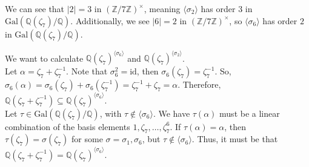 \documentclass[10pt]{extarticle}
\newcommand{\Q}{\mathbb{Q}}
\newcommand{\Z}{\mathbb{Z}}
\begin{document}
  We can see that $|2| = 3$ in $(\Z/7\Z)^{\times}$, meaning $\langle \sigma_2\rangle $ has order 3 in $\text{Gal}\left(\Q(\zeta_7)/\Q\right)$. Additionally, we see $|6| = 2$ in $\left(\Z/7\Z\right)^{\times}$, so $\langle \sigma_6\rangle$ has order $2$ in $\text{Gal}\left(\Q(\zeta_7)/\Q\right)$.
  \begin{center}
  \end{center}
  We want to calculate $\Q(\zeta_7)^{\langle \sigma_6\rangle}$ and $\Q(\zeta_7)^{\langle \sigma_2\rangle}$.\\

  Let $\alpha = \zeta_7 + \zeta_7^{-1}$. Note that $\sigma_6^2 = \text{id}$, then $\sigma_6(\zeta_7) = \zeta_7^{-1}$. So, $\sigma_6(\alpha) = \sigma_6(\zeta_7) + \sigma_6(\zeta_7^{-1}) = \zeta_7^{-1} + \zeta_7 = \alpha$. Therefore, $\Q(\zeta_7 + \zeta_7^{-1}) \subseteq \Q(\zeta_7)^{\langle \sigma_6\rangle}$.\\

  Let $\tau\in\text{Gal}\left(\Q(\zeta_7)/\Q\right)$, with $\tau \notin \langle \sigma_6\rangle$. We have $\tau(\alpha)$ must be a linear combination of the basis elements $1,\zeta_7,\dots,\zeta_7^6$. If $\tau(\alpha) = \alpha$, then $\tau(\zeta_7)=\sigma(\zeta_7)$ for some $\sigma = \sigma_1,\sigma_6$, but $\tau\notin\langle \sigma_6\rangle$. Thus, it must be that $\Q(\zeta_7 + \zeta_7^{-1}) = \Q(\zeta_7)^{\langle \sigma_6\rangle}$.\\
\end{document}
